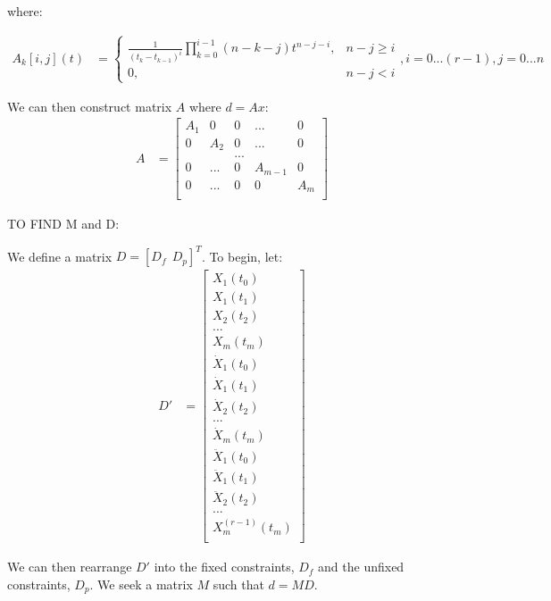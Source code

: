 \documentclass[11pt]{article}
\begin{document}
where:

\begin{align*}
A_k[i, j] (t) &= 
\begin{cases}
    \frac{1}{(t_k-t_{k-1})^i} \prod_{k=0}^{i-1} {(n-k-j)} t^{n-j-i}, & n-j \ge i \\
    0, & n-j < i
\end{cases}, i = 0...(r-1), j = 0...n
\end{align*}

We can then construct matrix $A$ where $d = Ax$:
\begin{align}
\label{eqn: A_joint} A &= 
\begin{bmatrix}
  A_1 & 0 & 0 & ... & 0 \\
  0 & A_2 & 0 & ... & 0 \\
  & & ... & &  \\
  0 & ... & 0 & A_{m-1} & 0 \\
  0 & ... & 0 & 0 & A_{m} \\ 
 \end{bmatrix}
\end{align} 


\mbox{} \newline
\mbox{} \newline
TO FIND M and D: \newline

We define a matrix $D = [D_f \ \ D_p]^T$. To begin, let:
\begin{align*}
D' &= 
\begin{bmatrix}
  X_1 (t_0) \\
  X_1(t_1) \\
  X_2(t_2) \\  
  ... \\
  X_m(t_m) \\
   \dot{X}_1 (t_0) \\
  \dot{X}_1(t_1) \\
  \dot{X}_2(t_2) \\  
  ... \\
  \dot{X}_m(t_m) \\
  \ddot{X}_1 (t_0) \\
   \ddot{X}_1(t_1) \\
 \ddot{X}_2(t_2) \\  
  ... \\
  X^{(r-1)}_m(t_m) \\
 \end{bmatrix}
\end{align*}

We can then rearrange $D'$ into the fixed constraints, $D_f$ and the unfixed constraints, $D_p$. We seek a matrix $M$ such that $d = MD$. 
\end{document}
